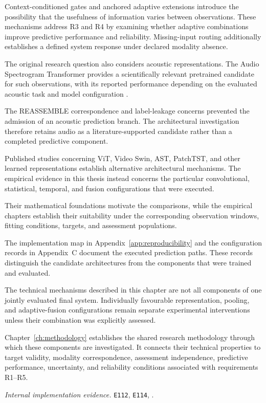 Context-conditioned gates and anchored adaptive extensions introduce the possibility that the usefulness of information varies between observations. These mechanisms address R3 and R4 by examining whether adaptive combinations improve predictive performance and reliability. Missing-input routing additionally establishes a defined system response under declared modality absence.

The original research question also considers acoustic representations. The Audio Spectrogram Transformer provides a scientifically relevant pretrained candidate for such observations, with its reported performance depending on the evaluated acoustic task and model configuration \parencite{P011}.

The REASSEMBLE correspondence and label-leakage concerns prevented the admission of an acoustic prediction branch. The architectural investigation therefore retains audio as a literature-supported candidate rather than a completed predictive component.

Published studies concerning ViT, Video Swin, AST, PatchTST, and other learned representations establish alternative architectural mechanisms. The empirical evidence in this thesis instead concerns the particular convolutional, statistical, temporal, and fusion configurations that were executed.

Their mathematical foundations motivate the comparisons, while the empirical chapters establish their suitability under the corresponding observation windows, fitting conditions, targets, and assessment populations.

The implementation map in Appendix~\ref{app:reproducibility} and the configuration records in Appendix~C document the executed prediction paths. These records distinguish the candidate architectures from the components that were trained and evaluated.

The technical mechanisms described in this chapter are not all components of one jointly evaluated final system. Individually favourable representation, pooling, and adaptive-fusion configurations remain separate experimental interventions unless their combination was explicitly assessed.

Chapter~\ref{ch:methodology} establishes the shared research methodology through which these components are investigated. It connects their technical properties to target validity, modality correspondence, assessment independence, predictive performance, uncertainty, and reliability conditions associated with requirements R1–R5.

\noindent\textit{Internal implementation evidence.} \texttt{E112}, \texttt{E114}, .

